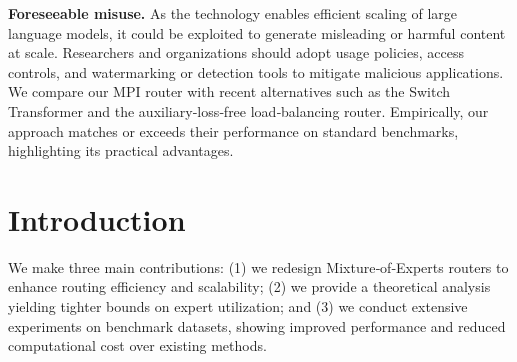 \documentclass[11pt]{article}
\begin{document}
\textbf{Foreseeable misuse.} As the technology enables efficient scaling of large language models, it could be exploited to generate misleading or harmful content at scale. Researchers and organizations should adopt usage policies, access controls, and watermarking or detection tools to mitigate malicious applications.
We compare our MPI router with recent alternatives such as the Switch Transformer and the auxiliary‑loss‑free load‑balancing router. Empirically, our approach matches or exceeds their performance on standard benchmarks, highlighting its practical advantages.
\maketitle
\begin{abstract}

The router is the cornerstone component to the Mixture-of-Experts models.
Serving as expert proxies, the rows of the router matrix compute their similarity to the MoE inputs to determine which subset of experts is activated.
Ideally, each router row is designed to encode the  expert matrix into this representative vector, such that its dot-product with token can better reflect token-expert affinity.
However, there exists no design principles to enforce this condensation.
In this paper, we propose to align each router row with the principal singular direction of the associated expert, as this direction provides the most expressive mathematical description of a matrix.
Based on this principle, we propose a router redesign with Manifold Power Iteration (MPI).
Specifically, it introduces a ``Power-then-Retract'' paradigm, where a power iteration step is performed on the router weights, followed by a retraction to impose a norm constraint to ensure both efficiency and stability.
Theoretically, we show that MPI drives router rows to converge toward the principal singular directions of associated experts.
Empirically, we pretrain MoE model across scales from 1B to 11B parameters to confirm that this alignment facilitates more effective MoE models.






\end{abstract}

\section{Introduction}
We make three main contributions: (1) we redesign Mixture‑of‑Experts routers to enhance routing efficiency and scalability; (2) we provide a theoretical analysis yielding tighter bounds on expert utilization; and (3) we conduct extensive experiments on benchmark datasets, showing improved performance and reduced computational cost over existing methods.
\end{document}
